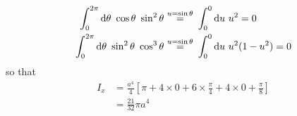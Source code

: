 {\begin{eg}[Cardoid]
\begin{align*}
\int_0^{2\pi}\dee{\theta}\ \cos\theta\ \sin^2\theta
     &\eqover{u=\sin\theta} \int_0^0\dee{u}\ u^2
     =0 \\
\int_0^{2\pi}\dee{\theta}\ \sin^2\theta\ \cos^3\theta
     &\eqover{u=\sin\theta} \int_0^0\dee{u}\ u^2(1-u^2)
     =0 \\
\end{align*}
so that
\begin{align*}
I_x&= \frac{a^4}{4}\left[\pi + 4\times 0 +6\times \frac{\pi}{4}+4\times 0
                        +\frac{\pi}{8}\right] \\
   &=\frac{21}{32}\pi a^4
\end{align*}


\end{eg}
}



%
%
%
%

